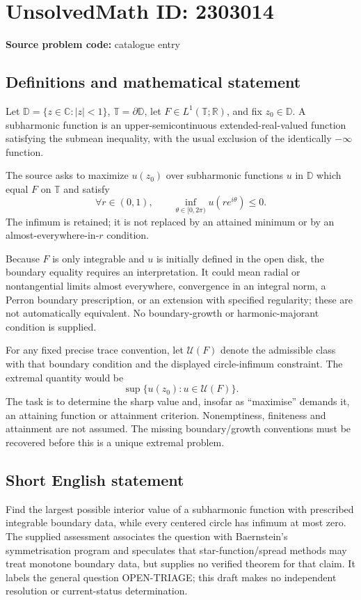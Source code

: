\documentclass[11pt]{article}
\newcommand{\R}{\mathbb{R}}
\newcommand{\C}{\mathbb{C}}
\begin{document}
\section*{UnsolvedMath ID: 2303014}
\textbf{Source problem code:} catalogue entry
\subsection{Definitions and mathematical statement}
Let $\mathbb D=\{z\in\C:|z|<1\}$, $\mathbb T=\partial\mathbb D$, let $F\in L^1(\mathbb T;\R)$, and fix $z_0\in\mathbb D$. A subharmonic function is an upper-semicontinuous extended-real-valued function satisfying the submean inequality, with the usual exclusion of the identically $-\infty$ function.

The source asks to maximize $u(z_0)$ over subharmonic functions $u$ in $\mathbb D$ which equal $F$ on $\mathbb T$ and satisfy
\[
 \forall r\in(0,1),\qquad
 \inf_{\theta\in[0,2\pi)}u(re^{i\theta})\leq0.
\]
The infimum is retained; it is not replaced by an attained minimum or by an almost-everywhere-in-$r$ condition.

Because $F$ is only integrable and $u$ is initially defined in the open disk, the boundary equality requires an interpretation. It could mean radial or nontangential limits almost everywhere, convergence in an integral norm, a Perron boundary prescription, or an extension with specified regularity; these are not automatically equivalent. No boundary-growth or harmonic-majorant condition is supplied.

For any fixed precise trace convention, let $\mathcal U(F)$ denote the admissible class with that boundary condition and the displayed circle-infimum constraint. The extremal quantity would be
\[
 \sup\{u(z_0):u\in\mathcal U(F)\}.
\]
The task is to determine the sharp value and, insofar as ``maximise'' demands it, an attaining function or attainment criterion. Nonemptiness, finiteness and attainment are not assumed. The missing boundary/growth conventions must be recovered before this is a unique extremal problem.
\subsection{Short English statement}
Find the largest possible interior value of a subharmonic function with prescribed integrable boundary data, while every centered circle has infimum at most zero. The supplied assessment associates the question with Baernstein's symmetrisation program and speculates that star-function/spread methods may treat monotone boundary data, but supplies no verified theorem for that claim. It labels the general question OPEN-TRIAGE; this draft makes no independent resolution or current-status determination.
\end{document}
